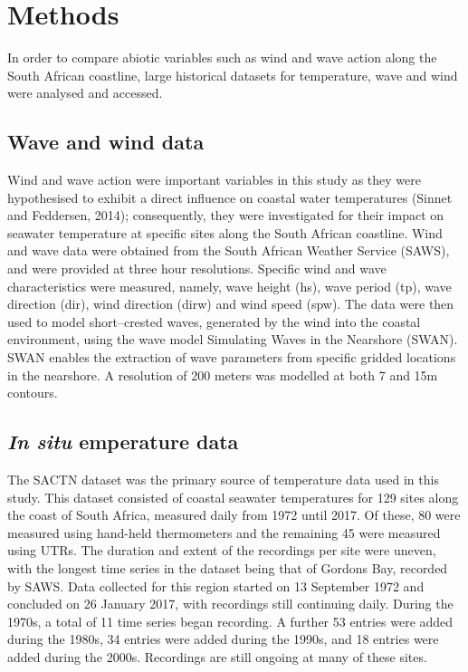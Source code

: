\documentclass[12pt,A4paper,]{article}
\begin{document}
\section{Methods}\label{methods}

In order to compare abiotic variables such as wind and wave action along
the South African coastline, large historical datasets for temperature,
wave and wind were analysed and accessed.

\subsection{Wave and wind data}\label{wave-and-wind-data}

Wind and wave action were important variables in this study as they were
hypothesised to exhibit a direct influence on coastal water temperatures
(Sinnet and Feddersen, 2014); consequently, they were investigated for
their impact on seawater temperature at specific sites along the South
African coastline. Wind and wave data were obtained from the South
African Weather Service (SAWS), and were provided at three hour
resolutions. Specific wind and wave characteristics were measured,
namely, wave height (hs), wave period (tp), wave direction (dir), wind
direction (dirw) and wind speed (spw). The data were then used to model
short--crested waves, generated by the wind into the coastal
environment, using the wave model Simulating Waves in the Nearshore
(SWAN). SWAN enables the extraction of wave parameters from specific
gridded locations in the nearshore. A resolution of 200 meters was
modelled at both 7 and 15m contours.

\subsection{\texorpdfstring{\emph{In situ} emperature
data}{In situ emperature data}}\label{in-situ-emperature-data}

The SACTN dataset was the primary source of temperature data used in
this study. This dataset consisted of coastal seawater temperatures for
129 sites along the coast of South Africa, measured daily from 1972
until 2017. Of these, 80 were measured using hand-held thermometers and
the remaining 45 were measured using UTRs. The duration and extent of
the recordings per site were uneven, with the longest time series in the
dataset being that of Gordons Bay, recorded by SAWS. Data collected for
this region started on 13 September 1972 and concluded on 26 January
2017, with recordings still continuing daily. During the 1970s, a total
of 11 time series began recording. A further 53 entries were added
during the 1980s, 34 entries were added during the 1990s, and 18 entries
were added during the 2000s. Recordings are still ongoing at many of
these sites.
\end{document}
